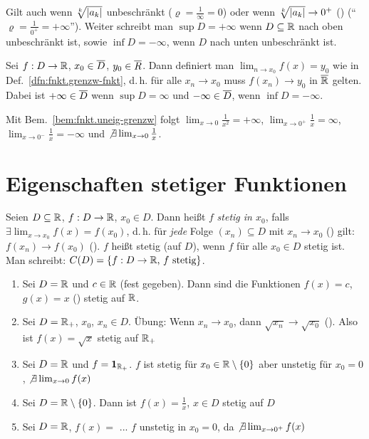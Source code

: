 \documentclass[12pt]{scrreprt}
\begin{document}
\noindent Gilt auch wenn $\sqrt[k]{\left\lvert a_k\right\lvert}$ unbeschränkt ($\varrho = \frac{1}{\infty} = 0$) oder wenn $\sqrt[k]{\left\lvert a_k\right\lvert} \to 0^+$ (\kinf)
("`$\varrho = \frac{1}{0^+} = +\infty$"'). Weiter schreibt man $\sup D = +\infty$ wenn $D\subseteq\mathbb{R}$ nach oben unbeschränkt
ist, sowie $\inf D= -\infty$, wenn $D$ nach unten unbeschränkt ist.

Sei $f: D\rightarrow\mathbb{R}$, $x_0\in\overline{D}$, $y_0\in\overline{R}$. Dann definiert man $\lim_{n\to x_0} f(x) = y_0$ wie in Def.~\ref{dfn:fnkt.grenzw-fnkt},
d.\,h. für alle $x_n \to x_0$ muss $f(x_n)\to y_0$ in $\overline{\mathbb{R}}$ gelten. Dabei ist $+\infty\in\overline{D}$ wenn $\sup D = \infty$ und
$-\infty \in \overline{D}$, wenn $\inf D = -\infty$.

\begin{bsp*}
Mit Bem.~\ref{bem:fnkt.uneig-grenzw} folgt $\lim_{x\to 0}\frac{1}{x^2} = +\infty$, $\lim_{x\to 0^+}\frac{1}{x} = \infty$,
$\lim_{x\to 0^-}\frac{1}{x} = -\infty$ und $\not\exists\lim_{x\to 0}\frac{1}{x}$.
\end{bsp*}

\section{Eigenschaften stetiger Funktionen}
\label{sec:fnkt.stetige-fnkt}

\begin{dfn}\label{dfn:fnkt.stetigkeit}
Seien $D \subseteq\mathbb{R}$, $f: D\rightarrow\mathbb{R}$, $x_0\in D$. Dann heißt $f$ \emph{stetig in $x_0$}, falls 
$\exists \lim_{x\to x_0} f(x) = f(x_0)$, d.\,h. für \emph{jede} Folge $(x_n) \subseteq D$ mit $x_n \to x_0$
(\ninf) gilt: $f(x_n) \to f(x_0)$ (\ninf). $f$ heißt stetig (auf $D$), wenn $f$ für alle $x_0\in D$ stetig ist.
Man schreibt: $C(D) = \{f: D\rightarrow \mathbb{R}\text{, $f$ stetig}\}$.
\end{dfn}

\begin{bsp}\label{bsp:fnkt.stetigkeit}
\begin{enumerate}
\item Sei $D=\mathbb{R}$ und $c\in\mathbb{R}$ (fest gegeben). Dann sind die Funktionen $f(x)=c$, $g(x)=x$
() stetig auf $\mathbb{R}$.\label{bsp:fnkt.stetigkeit.a}
\item Sei $D=\mathbb{R}_+$, $x_0$, $x_n\in D$. Übung: Wenn $x_n\to x_0$, dann $\sqrt{x_n}\to\sqrt{x_0}$
(\ninf). Also ist $f(x) = \sqrt{x}$ stetig auf $\mathbb{R}_+$\label{bsp:fnkt.stetigkeit.b}
\item Sei $D=\mathbb{R}$ und $f=\mathbf{1}_{\mathbb{R}_+}$. \folgt $f$ ist stetig für $x_0\in\mathbb{R}\setminus\{0\}$
aber unstetig für $x_0 = 0$, $\not\exists\lim_{x\to 0} f(x)$\label{bsp:fnkt.stetigkeit.c}
\item Sei $D=\mathbb{R}\setminus\{0\}$. Dann ist $f(x) = \frac{1}{x}$, $x\in D$ stetig auf $D$\label{bsp:fnkt.stetigkeit.d}
\item Sei $D=\mathbb{R}$, $f(x) = $ ...%
\folgt $f$ unstetig in $x_0=0$, da $\not\exists\lim_{x\to 0^+} f(x)$\label{bsp:fnkt.stetigkeit.e}
\end{enumerate}
\end{bsp}
\end{document}
